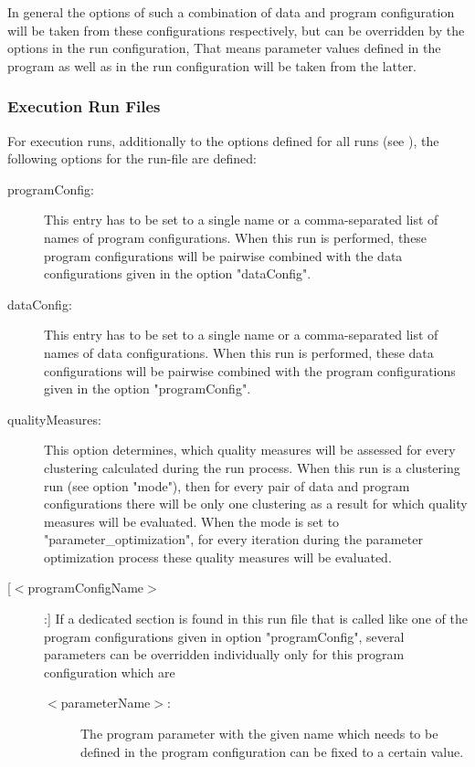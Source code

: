 		  In general the options of such a combination of data and program configuration will be taken from these configurations respectively, but can be overridden by the options in the run configuration, That means parameter values defined in the program as well as in the run configuration will be taken from the latter.
		 
		 \subsubsection{Execution Run Files}\label{execution_run_files} For execution runs, additionally to the options defined for all runs (see ), the following options for the run-file are defined:
		 \begin{description}
			\item[programConfig:]
			This entry has to be set to a single name or a comma-separated list of names of program configurations. When this run is performed, these program configurations will be pairwise combined with the data configurations given in the option "dataConfig". 
			\item[dataConfig:]
			This entry has to be set to a single name or a comma-separated list of names of data configurations. When this run is performed, these data configurations will be pairwise combined with the program configurations given in the option "programConfig". 
			\item[qualityMeasures:] \label{subsubsec:runconfigqualmeasure}
				This option determines, which quality measures will be assessed for every clustering calculated during the run process. When this run is a clustering run (see option "mode"), then for every pair of data and program configurations there will be only one clustering as a result for which quality measures will be evaluated. When the mode is set to "parameter\_optimization", for every iteration during the parameter optimization process these quality measures will be evaluated.
			\item[[$<$programConfigName$>$]:]
			If a dedicated section is found in this run file that is called like one of the program configurations given in option "programConfig", several parameters can be overridden individually only for this program configuration which are
			\begin{description}			 	
				\item[$<$parameterName$>$:] The program parameter with the given name which needs to be defined in the program configuration can be fixed to a certain value.
\end{description}
		 \end{description}
		  
